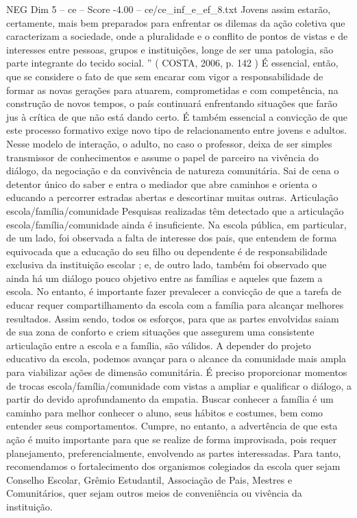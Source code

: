 \begin{textsample}{NEG Dim 5 – ce – Score -4.00 – ce/ce\_inf\_e\_ef\_8.txt}
Jovens assim estarão, certamente, mais bem preparados para enfrentar os dilemas da ação coletiva que caracterizam a sociedade, onde a pluralidade e o conflito de pontos de vistas e de interesses entre pessoas, grupos e instituições, longe de ser uma patologia, são parte integrante do tecido social. ” ( COSTA, 2006, p. 142 ) É essencial, então, que se considere o fato de que sem encarar com vigor a responsabilidade de formar as novas gerações para atuarem, comprometidas e com competência, na construção de novos tempos, o país continuará enfrentando situações que farão jus à crítica de que não está dando certo.
É também essencial a convicção de que este processo formativo exige novo tipo de relacionamento entre jovens e adultos.
Nesse modelo de interação, o adulto, no caso o professor, deixa de ser simples transmissor de conhecimentos e assume o papel de parceiro na vivência do diálogo, da negociação e da convivência de natureza comunitária.
Sai de cena o detentor único do saber e entra o mediador que abre caminhos e orienta o educando a percorrer estradas abertas e descortinar muitas outras.
Articulação escola/família/comunidade Pesquisas realizadas têm detectado que a articulação escola/família/comunidade ainda é insuficiente.
Na escola pública, em particular, de um lado, foi observada a falta de interesse dos pais, que entendem de forma equivocada que a educação do seu filho ou dependente é de responsabilidade exclusiva da instituição escolar ; e, de outro lado, também foi observado que ainda há um diálogo pouco objetivo entre as famílias e aqueles que fazem a escola.
No entanto, é importante fazer prevalecer a convicção de que a tarefa de educar requer compartilhamento da escola com a família para alcançar melhores resultados.
Assim sendo, todos os esforços, para que as partes envolvidas saiam de sua zona de conforto e criem situações que assegurem uma consistente articulação entre a escola e a família, são válidos.
A depender do projeto educativo da escola, podemos avançar para o alcance da comunidade mais ampla para viabilizar ações de dimensão comunitária.
É preciso proporcionar momentos de trocas escola/família/comunidade com vistas a ampliar e qualificar o diálogo, a partir do devido aprofundamento da empatia.
Buscar conhecer a família é um caminho para melhor conhecer o aluno, seus hábitos e costumes, bem como entender seus comportamentos.
Cumpre, no entanto, a advertência de que esta ação é muito importante para que se realize de forma improvisada, pois requer planejamento, preferencialmente, envolvendo as partes interessadas.
Para tanto, recomendamos o fortalecimento dos organismos colegiados da escola quer sejam Conselho Escolar, Grêmio Estudantil, Associação de Pais, Mestres e Comunitários, quer sejam outros meios de conveniência ou vivência da instituição.

\end{textsample}
